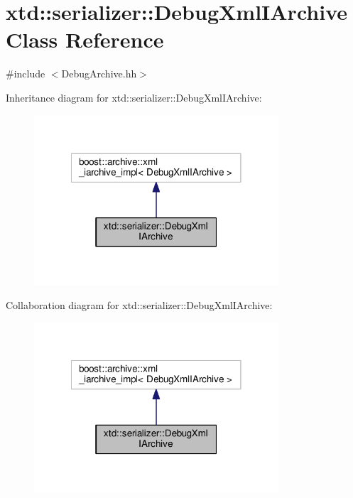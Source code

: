 \hypertarget{classxtd_1_1serializer_1_1DebugXmlIArchive}{\section{xtd\-:\-:serializer\-:\-:Debug\-Xml\-I\-Archive Class Reference}
\label{classxtd_1_1serializer_1_1DebugXmlIArchive}
}


{\ttfamily \#include $<$Debug\-Archive.\-hh$>$}



Inheritance diagram for xtd\-:\-:serializer\-:\-:Debug\-Xml\-I\-Archive\-:
\nopagebreak
\begin{figure}[H]
\begin{center}
\leavevmode
\includegraphics[width=258pt]{classxtd_1_1serializer_1_1DebugXmlIArchive__inherit__graph}
\end{center}
\end{figure}


Collaboration diagram for xtd\-:\-:serializer\-:\-:Debug\-Xml\-I\-Archive\-:
\nopagebreak
\begin{figure}[H]
\begin{center}
\leavevmode
\includegraphics[width=258pt]{classxtd_1_1serializer_1_1DebugXmlIArchive__coll__graph}
\end{center}
\end{figure}
